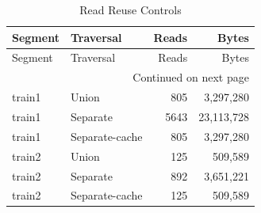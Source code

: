 \begingroup\small\setlength{\tabcolsep}{5pt}
\begin{longtable}{@{}llrr@{}}
\caption{Read Reuse Controls}\label{tab:reuse}\\
\toprule Segment & Traversal & Reads & Bytes\\\midrule\endfirsthead
\toprule Segment & Traversal & Reads & Bytes\\\midrule\endhead
\midrule\multicolumn{4}{r}{Continued on next page}\\\endfoot
\bottomrule\endlastfoot
train1 & Union & 805 & 3,297,280\\
train1 & Separate & 5643 & 23,113,728\\
train1 & Separate-cache & 805 & 3,297,280\\
train2 & Union & 125 & 509,589\\
train2 & Separate & 892 & 3,651,221\\
train2 & Separate-cache & 125 & 509,589\\
\end{longtable}
\endgroup
